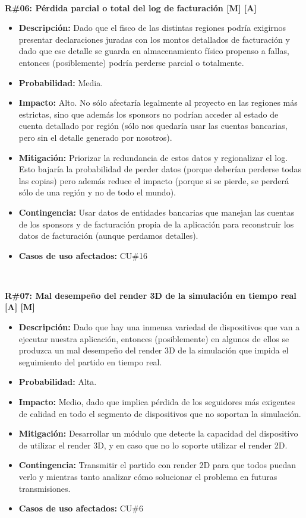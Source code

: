 ~

\noindent\textbf{R\#06: Pérdida parcial o total del log de facturación [M] [A] } 
\begin{itemize}
	\item{\textbf{Descripción:} Dado que el fisco de las distintas regiones podría exigirnos presentar declaraciones juradas con los montos detallados de facturación y dado que ese detalle se guarda en almacenamiento físico propenso a fallas, entonces (posiblemente) podría perderse parcial o totalmente.}
	\item{\textbf{Probabilidad:} Media.}
	\item{\textbf{Impacto:} Alto. No sólo afectaría legalmente al proyecto en las regiones más estrictas, sino que además los sponsors no podrían acceder al estado de cuenta detallado por región (sólo nos quedaría usar las cuentas bancarias, pero sin el detalle generado por nosotros).}
	\item{\textbf{Mitigación:} Priorizar la redundancia de estos datos y regionalizar el log. Esto bajaría la probabilidad de perder datos (porque deberían perderse todas las copias) pero además reduce el impacto (porque si se pierde, se perderá sólo de una región y no de todo el mundo).}
	\item{\textbf{Contingencia:} Usar datos de entidades bancarias que manejan las cuentas de los sponsors y de facturación propia de la aplicación para reconstruir los datos de facturación (aunque perdamos detalles).}
	\item{\textbf{Casos de uso afectados:} CU\#16}
\end{itemize}

~

\noindent\textbf{R\#07: Mal desempeño del render 3D de la simulación en tiempo real [A] [M] } 
\begin{itemize}
	\item{\textbf{Descripción:} Dado que hay una inmensa variedad de dispositivos que van a ejecutar nuestra aplicación, entonces (posiblemente) en algunos de ellos se produzca un mal desempeño del render 3D de la simulación que impida el seguimiento del partido en tiempo real.}
	\item{\textbf{Probabilidad:} Alta.}
	\item{\textbf{Impacto:} Medio, dado que implica pérdida de los seguidores más exigentes de calidad en todo el segmento de dispositivos que no soportan la simulación.}
	\item{\textbf{Mitigación:} Desarrollar un módulo que detecte la capacidad del dispositivo de utilizar el render 3D, y en caso que no lo soporte utilizar el render 2D.}
	\item{\textbf{Contingencia:} Transmitir el partido con render 2D para que todos puedan verlo y mientras tanto analizar cómo solucionar el problema en futuras transmisiones.}
	\item{\textbf{Casos de uso afectados:} CU\#6}
\end{itemize}


